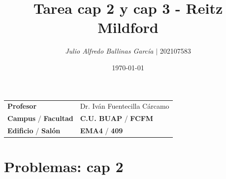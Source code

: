 \documentclass{article}
\title{Tarea \textcolor{Apple Green}{\textbf{cap 2}} y \textcolor{Cinnabar}{\textbf{cap 3}}   - \textcolor{Tarawera}{\textbf{Reitz Mildford}}}
\author{\emph{Julio Alfredo Ballinas García} $\boldsymbol{\mid}$ 202107583}
\date{\today}
\begin{document}
\maketitle



\begin{mybox}
\noindent\begin{tabular}{@{}ll}
	{\bfseries{Profesor}} & Dr. Iván Fuentecilla Cárcamo\\
	\textcolor{prussianblue}{\bfseries{Campus}} / \textcolor{trueblue}{\bfseries{Facultad}}  & \textcolor{prussianblue}{\bfseries{C.U. BUAP}} /  \textcolor{trueblue}{\bfseries{FCFM}} \\
	\textcolor{prussianblue}{\bfseries{Edificio}} /  \textcolor{trueblue}{\bfseries{Salón}}    & 	\textcolor{prussianblue}{\bfseries{EMA4}} /  \textcolor{trueblue}{\bfseries{409}}   
\end{tabular} 
\end{mybox} \vspace{1cm}

\section*{\textcolor{Apple Green}{\textbf{Problemas: cap 2}}}
\end{document}
